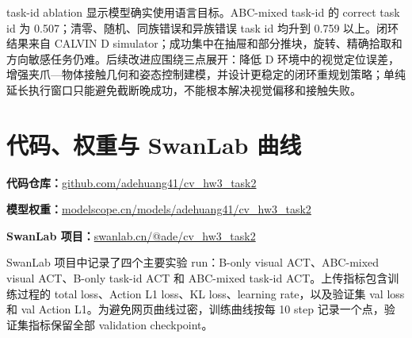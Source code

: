\documentclass[11pt,a4paper,fontset=fandol]{ctexart}
\newcommand{\actionlone}{Action L1}
\begin{document}
task-id ablation 显示模型确实使用语言目标。ABC-mixed task-id 的 correct task id 为 0.507；清零、随机、同族错误和异族错误 task id 均升到 0.759 以上。闭环结果来自 CALVIN D simulator；成功集中在抽屉和部分推块，旋转、精确拾取和方向敏感任务仍难。后续改进应围绕三点展开：降低 D 环境中的视觉定位误差，增强夹爪—物体接触几何和姿态控制建模，并设计更稳定的闭环重规划策略；单纯延长执行窗口只能避免截断晚成功，不能根本解决视觉偏移和接触失败。

\clearpage
\section*{代码、权重与 SwanLab 曲线}

\small
\noindent\textbf{代码仓库：}\href{https://github.com/adehuang41/cv_hw3_task2}{github.com/adehuang41/cv\_hw3\_task2}\par
\noindent\textbf{模型权重：}\href{https://modelscope.cn/models/adehuang41/cv_hw3_task2}{modelscope.cn/models/adehuang41/cv\_hw3\_task2}\par
\noindent\textbf{SwanLab 项目：}\href{https://swanlab.cn/@ade/cv_hw3_task2}{swanlab.cn/@ade/cv\_hw3\_task2}\par

\vspace{0.7em}
SwanLab 项目中记录了四个主要实验 run：B-only visual ACT、ABC-mixed visual ACT、B-only task-id ACT 和 ABC-mixed task-id ACT。上传指标包含训练过程的 total loss、\actionlone{} loss、KL loss、learning rate，以及验证集 val loss 和 val \actionlone{}。为避免网页曲线过密，训练曲线按每 10 step 记录一个点，验证集指标保留全部 validation checkpoint。
\end{document}
